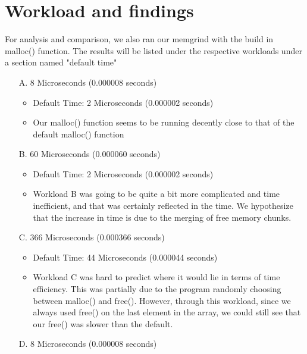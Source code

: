 \documentclass{article}
\begin{document}
    \section*{Workload and findings}
    For analysis and comparison, we also ran our memgrind with the build in malloc() function. The results will be listed under the respective workloads under a section named "default time"
    \begin{enumerate}
        \item[A.]
            8 Microseconds (0.000008 seconds)
            \begin{itemize}
                \item
                    Default Time: 2 Microseconds (0.000002 seconds)
                \item
                    Our malloc() function seems to be running decently close to that of the default malloc() function
            \end{itemize}
        \item[B.]
            60 Microseconds (0.000060 seconds)
            \begin{itemize}
                \item
                    Default Time: 2 Microseconds (0.000002 seconds)
                \item
                    Workload B was going to be quite a bit more complicated and time inefficient, and that was certainly reflected in the time. We hypothesize that the increase in time is due to the merging of free memory chunks.
            \end{itemize}
        \item[C.]
            366 Microseconds (0.000366 seconds)
            \begin{itemize}
                \item
                    Default Time: 44 Microseconds (0.000044 seconds)
                \item
                    Workload C was hard to predict where it would lie in terms of time efficiency. This was partially due to the program randomly choosing between malloc() and free(). However, through this workload, since we always used free() on the last element in the array, we could still see that our free() was slower than the default. 
            \end{itemize}
        \item[D.]
            8 Microseconds (0.000008 seconds)
            \begin{itemize}

\end{itemize}
\end{enumerate}
\end{document}
